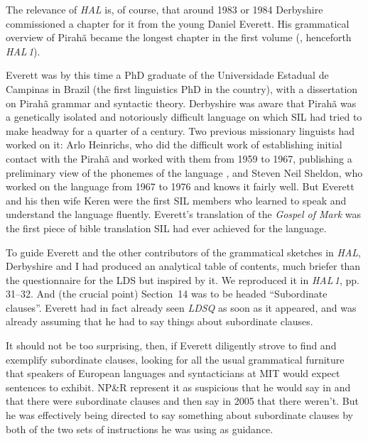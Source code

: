 \documentclass[output=paper,colorlinks,citecolor=brown
]{langscibook}
\begin{document}
\begin{sloppypar}
The relevance of \textit{HAL} is, of course, that around 1983 or 1984
Derbyshire commissioned a chapter for it from the young Daniel Everett.
His grammatical overview of Pirahã became the longest chapter in
the first volume (\citealt{DerbPull86}, henceforth \textit{HAL\,1}).
\end{sloppypar}

Everett was by this time a PhD graduate of the Universidade Estadual
de Campinas in Brazil (the first linguistics PhD in the country),
with a dissertation on Pirahã grammar and syntactic theory.
Derbyshire was aware that Pirahã was a genetically isolated and
notoriously difficult language on which SIL had tried to make headway
for a quarter of a century. Two previous missionary linguists had
worked on it: Arlo Heinrichs, who did the difficult work of
establishing initial contact with the Pirahã and worked with them
from 1959 to 1967, publishing a preliminary view of the phonemes of
the language \citep{Heinrichs64}, and Steven Neil Sheldon, who worked
on the language from 1967 to 1976 and knows it fairly well. But Everett
and his then wife Keren were the first SIL members who learned to
speak and understand the language fluently. Everett's translation of
the \textit{Gospel of Mark} \citep{Everett86Mark} was the first piece
of bible translation SIL had ever achieved for the language.

To guide Everett and the other contributors of the grammatical sketches
in \textit{HAL}, Derbyshire and I had produced an analytical table
of contents, much briefer than the questionnaire for the LDS but
inspired by it. We reproduced it in \textit{HAL\,1}, pp.\,31--32.
And (the crucial point) Section~14 was to be headed ``Subordinate
clau\-ses''. Everett had in fact already seen \textit{LDSQ} as soon as
it appeared, and was already assuming that he had to say things about
subordinate clauses.



It should not be too surprising, then, if Everett diligently strove
to find and exemplify subordinate clauses, looking for all the usual
grammatical furniture that speakers of European languages and
syntacticians at MIT would expect sentences to exhibit. NP\&R represent
it as suspicious that he would say in \citeyear{Everett83} and
\citeyear{Everett86HAL} that there were subordinate clauses and then
say in 2005 that there weren't. But he was effectively being directed
to say something about subordinate clauses by both of the two sets of
instructions he was using as guidance.
\end{document}

